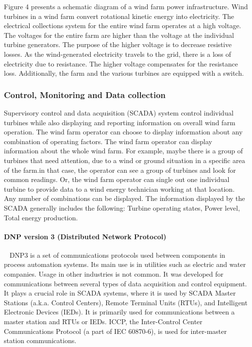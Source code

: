 \documentclass[twosided,a4,10pt]{article}
\begin{document}
\begin{multicols}{2}

Figure 4 presents a schematic diagram of a wind farm power infrastructure. Wind turbines in a wind farm convert rotational kinetic energy into electricity. \newline
The electrical collections system for the entire wind farm operates at a high voltage. The voltages for the entire farm are higher than the voltage at the individual turbine generators. The purpose of the higher voltage is to decrease resistive losses. As the wind-generated electricity travels to the grid, there is a loss of electricity due to resistance. The higher voltage compensates for the resistance loss. Additionally, the farm and the various turbines are equipped with a switch.
 \subsubsection{Control, Monitoring and Data collection}
 Supervisory control and data acquisition (SCADA) system control individual turbines while also displaying and reporting information on overall wind farm operation. The wind farm operator can choose to display information about any combination of operating factors.\newline
 The wind farm operator can display information about the whole wind farm. For example, maybe there is a group of turbines that need attention, due to a wind or ground situation in a specific area of the farm.in that case, the operator can see a group of turbines and look for common readings. Or, the wind farm operator can single out one individual turbine to provide data to a wind energy technician working at that location. Any number of combinations can be displayed. The information displayed by the SCADA generally includes the following: Turbine operating states, Power level, Total energy production.
 \paragraph{DNP version 3 (Distributed Network Protocol)} ~ \newline
 DNP3 is a set of communications protocols used between components in process automation systems. Its main use is in utilities such as electric and water companies. Usage in other industries is not common. It was developed for communications between several types of data acquisition and control equipment. It plays a crucial role in SCADA systems, where it is used by SCADA Master Stations (a.k.a. Control Centers), Remote Terminal Units (RTUs), and Intelligent Electronic Devices (IEDs). It is primarily used for communications between a master station and RTUs or IEDs. ICCP, the Inter-Control Center Communications Protocol (a part of IEC 60870-6), is used for inter-master station communications.

\end{multicols}
\end{document}
